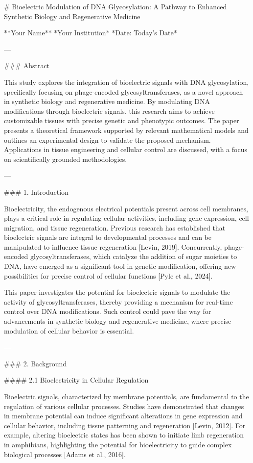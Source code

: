 # Bioelectric Modulation of DNA Glycosylation: A Pathway to Enhanced Synthetic Biology and Regenerative Medicine

**Your Name**  
*Your Institution*  
*Date: Today’s Date*

---

### Abstract

This study explores the integration of bioelectric signals with DNA glycosylation, specifically focusing on phage-encoded glycosyltransferases, as a novel approach in synthetic biology and regenerative medicine. By modulating DNA modifications through bioelectric signals, this research aims to achieve customizable tissues with precise genetic and phenotypic outcomes. The paper presents a theoretical framework supported by relevant mathematical models and outlines an experimental design to validate the proposed mechanism. Applications in tissue engineering and cellular control are discussed, with a focus on scientifically grounded methodologies.

---

### 1. Introduction

Bioelectricity, the endogenous electrical potentials present across cell membranes, plays a critical role in regulating cellular activities, including gene expression, cell migration, and tissue regeneration. Previous research has established that bioelectric signals are integral to developmental processes and can be manipulated to influence tissue regeneration [Levin, 2019]. Concurrently, phage-encoded glycosyltransferases, which catalyze the addition of sugar moieties to DNA, have emerged as a significant tool in genetic modification, offering new possibilities for precise control of cellular functions [Pyle et al., 2024].

This paper investigates the potential for bioelectric signals to modulate the activity of glycosyltransferases, thereby providing a mechanism for real-time control over DNA modifications. Such control could pave the way for advancements in synthetic biology and regenerative medicine, where precise modulation of cellular behavior is essential.

---

### 2. Background

#### 2.1 Bioelectricity in Cellular Regulation

Bioelectric signals, characterized by membrane potentials, are fundamental to the regulation of various cellular processes. Studies have demonstrated that changes in membrane potential can induce significant alterations in gene expression and cellular behavior, including tissue patterning and regeneration [Levin, 2012]. For example, altering bioelectric states has been shown to initiate limb regeneration in amphibians, highlighting the potential for bioelectricity to guide complex biological processes [Adams et al., 2016].

